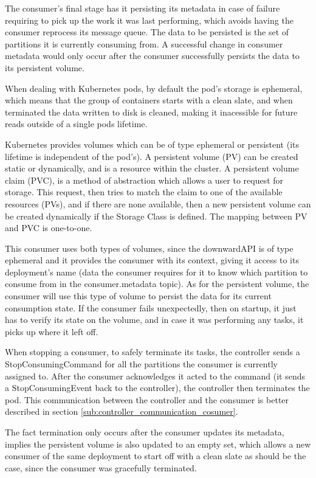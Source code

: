 The consumer's final stage has it persisting its metadata in case of failure
requiring to pick up the work it was last performing, which avoids having the
consumer reprocess its message queue. The data to be persisted is the set of
partitions it is currently consuming from. A successful change in consumer
metadata would only occur after the consumer successfully persists the data to
its persistent volume.

When dealing with Kubernetes pods, by default the pod's storage is ephemeral,
which means that the group of containers starts with a clean slate, and when
terminated the data written to disk is cleaned, making it inacessible for future
reads outside of a single pods lifetime.

Kubernetes provides volumes which can be of type ephemeral or persistent (its
lifetime is independent of the pod's). A persistent volume (PV) can be created
static or dynamically, and is a resource within the cluster. A persistent volume
claim (PVC), is a method of abstraction which allows a user to request for
storage. This request, then tries to match the claim to one of the available
resources (PVs), and if there are none available, then a new persistent volume can be
created dynamically if the Storage Class is defined. The mapping between PV and
PVC is one-to-one.

This consumer uses both types of volumes, since the downwardAPI is of type
ephemeral and it provides the consumer with its context, giving it access to
its deployment's name (data the consumer requires for it to know which
partition to consume from in the consumer.metadata topic).  As for the
persistent volume, the consumer will use this type of volume to persist the data
for its current consumption state. If the consumer fails unexpectedly, then on
startup, it just has to verify its state on the volume, and in case it was
performing any tasks, it picks up where it left off.

When stopping a consumer, to safely terminate its tasks, the controller sends a
StopConsumingCommand for all the partitions the consumer is currently assigned
to. After the consumer acknowledges it acted to the command (it sends a
StopConsumingEvent back to the controller), the controller then terminates the
pod. This communication between the controller and the consumer is better
described in section \ref{sub:controller_communication_cosumer}. 

The fact termination only occurs after the consumer updates its metadata,
implies the persistent volume is also updated to an empty set, which allows a
new consumer of the same deployment to start off with a clean slate as should be
the case, since the consumer was gracefully terminated.


